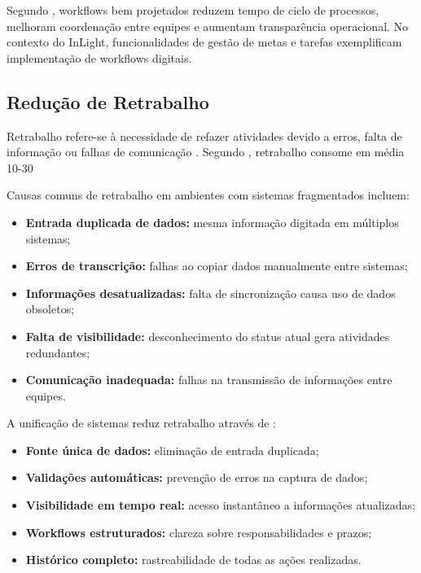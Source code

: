 Segundo \cite{vanderaalst2003}, workflows bem projetados reduzem tempo de ciclo de processos, melhoram coordenação entre equipes e aumentam transparência operacional. No contexto do InLight, funcionalidades de gestão de metas e tarefas exemplificam implementação de workflows digitais.

\subsection{Redução de Retrabalho}

Retrabalho refere-se à necessidade de refazer atividades devido a erros, falta de informação ou falhas de comunicação \cite{lean2003}. Segundo \cite{mckinsey2018}, retrabalho consome em média 10-30%

Causas comuns de retrabalho em ambientes com sistemas fragmentados incluem:

\begin{itemize}
    \item \textbf{Entrada duplicada de dados:} mesma informação digitada em múltiplos sistemas;
    \item \textbf{Erros de transcrição:} falhas ao copiar dados manualmente entre sistemas;
    \item \textbf{Informações desatualizadas:} falta de sincronização causa uso de dados obsoletos;
    \item \textbf{Falta de visibilidade:} desconhecimento do status atual gera atividades redundantes;
    \item \textbf{Comunicação inadequada:} falhas na transmissão de informações entre equipes.
\end{itemize}

A unificação de sistemas reduz retrabalho através de \cite{davenport2018}:

\begin{itemize}
    \item \textbf{Fonte única de dados:} eliminação de entrada duplicada;
    \item \textbf{Validações automáticas:} prevenção de erros na captura de dados;
    \item \textbf{Visibilidade em tempo real:} acesso instantâneo a informações atualizadas;
    \item \textbf{Workflows estruturados:} clareza sobre responsabilidades e prazos;
    \item \textbf{Histórico completo:} rastreabilidade de todas as ações realizadas.
\end{itemize}

